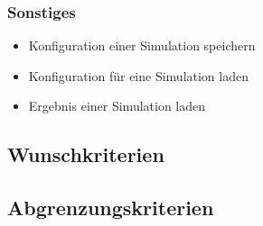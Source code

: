 \subsubsection{Sonstiges}
\begin{itemize}
\item Konfiguration einer Simulation speichern
\item Konfiguration für eine Simulation laden
\item Ergebnis einer Simulation laden
\end{itemize}

\subsection{Wunschkriterien}

\subsection{Abgrenzungskriterien}